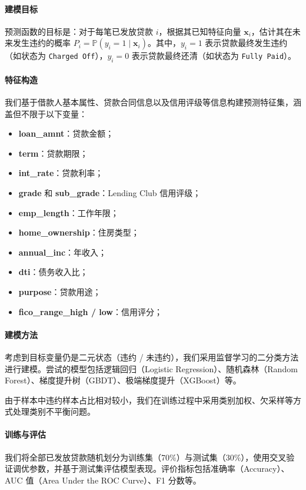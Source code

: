 \documentclass[nonblindrev]{write_paper}
\begin{document}
\paragraph{建模目标} 
预测函数的目标是：对于每笔已发放贷款 $i$，根据其已知特征向量 $\mathbf{x}_i$，估计其在未来发生违约的概率 $P_i = \mathbb{P}(y_i = 1 \mid \mathbf{x}_i)$。其中，$y_i=1$ 表示贷款最终发生违约（如状态为 \texttt{Charged Off}），$y_i=0$ 表示贷款最终还清（如状态为 \texttt{Fully Paid}）。

\paragraph{特征构造}
我们基于借款人基本属性、贷款合同信息以及信用评级等信息构建预测特征集，涵盖但不限于以下变量：

\begin{itemize}
  \item \textbf{loan\_amnt}：贷款金额；
  \item \textbf{term}：贷款期限；
  \item \textbf{int\_rate}：贷款利率；
  \item \textbf{grade} 和 \textbf{sub\_grade}：Lending Club 信用评级；
  \item \textbf{emp\_length}：工作年限；
  \item \textbf{home\_ownership}：住房类型；
  \item \textbf{annual\_inc}：年收入；
  \item \textbf{dti}：债务收入比；
  \item \textbf{purpose}：贷款用途；
  \item \textbf{fico\_range\_high / low}：信用评分；
\end{itemize}

\paragraph{建模方法}
考虑到目标变量仍是二元状态（违约 / 未违约），我们采用监督学习的二分类方法进行建模。尝试的模型包括逻辑回归（Logistic Regression）、随机森林（Random Forest）、梯度提升树（GBDT）、极端梯度提升（XGBoost）等。

由于样本中违约样本占比相对较小，我们在训练过程中采用类别加权、欠采样等方式处理类别不平衡问题。

\paragraph{训练与评估}

我们将全部已发放贷款随机划分为训练集（70\%）与测试集（30\%），使用交叉验证调优参数，并基于测试集评估模型表现。评价指标包括准确率（Accuracy）、AUC 值（Area Under the ROC Curve）、F1 分数等。
\end{document}
